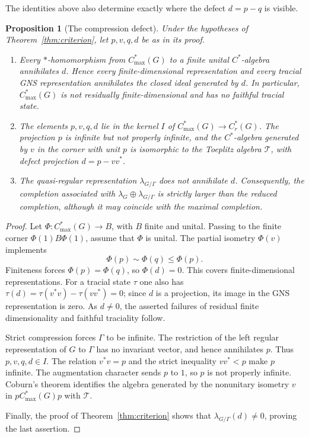 \documentclass[11pt]{article}
\newtheorem{proposition}[theorem]{Proposition}
\newcommand{\Td}{\mathcal T}
\newcommand{\Cmax}[1]{C^*_{\max}(#1)}
\newcommand{\Cr}[1]{C^*_r(#1)}
\begin{document}
The identities above also determine exactly where the defect $d=p-q$ is
visible.

\begin{proposition}[The compression defect]\label{prop:defect}
Under the hypotheses of Theorem~\ref{thm:criterion}, let $p,v,q,d$ be as
in its proof.
\begin{enumerate}
\item Every $*$-homomorphism from $\Cmax G$ to a finite unital
$C^*$-algebra annihilates $d$.  Hence every finite-dimensional
representation and every tracial GNS representation annihilates the closed
ideal generated by $d$.  In particular, $\Cmax G$ is not residually
finite-dimensional and has no faithful tracial state.
\item The elements $p,v,q,d$ lie in the kernel $I$ of
$\Cmax G\to\Cr G$.  The projection $p$ is infinite but not properly
infinite, and the $C^*$-algebra generated by $v$ in the corner with unit
$p$ is isomorphic to the Toeplitz algebra $\Td$, with defect projection
$d=p-vv^*$.
\item The quasi-regular representation $\lambda_{G/\Gamma}$ does not
annihilate $d$.  Consequently, the completion associated with
$\lambda_G\oplus\lambda_{G/\Gamma}$ is strictly larger than the reduced
completion, although it may coincide with the maximal completion.
\end{enumerate}
\end{proposition}

\begin{proof}
Let $\Phi:\Cmax G\to B$, with $B$ finite and unital.  Passing to the
finite corner $\Phi(1)B\Phi(1)$, assume that $\Phi$ is unital.  The partial
isometry $\Phi(v)$ implements
\[
 \Phi(p)\sim\Phi(q)\leq\Phi(p).
\]
Finiteness forces $\Phi(p)=\Phi(q)$, so $\Phi(d)=0$.  This covers
finite-dimensional representations.  For a tracial state $\tau$ one also
has $\tau(d)=\tau(v^*v)-\tau(vv^*)=0$; since $d$ is a projection, its
image in the GNS representation is zero.  As $d\neq0$, the asserted
failures of residual finite dimensionality and faithful traciality follow.

Strict compression forces $\Gamma$ to be infinite.  The restriction of the
left regular representation of $G$ to $\Gamma$ has no invariant vector, and
hence annihilates $p$.  Thus $p,v,q,d\in I$.  The relation $v^*v=p$ and
the strict inequality $vv^*<p$ make $p$ infinite.  The augmentation
character sends $p$ to $1$, so $p$ is not properly infinite.  Coburn's
theorem \cite{Coburn} identifies the algebra generated by the nonunitary
isometry $v$ in $p\Cmax Gp$ with $\Td$.

Finally, the proof of Theorem~\ref{thm:criterion} shows that
$\lambda_{G/\Gamma}(d)\neq0$, proving the last assertion.
\end{proof}
\end{document}
